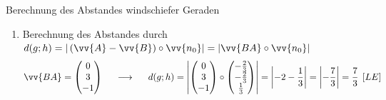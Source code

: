 \begin{bsp}{Berechnung des Abstandes windschiefer Geraden}{}
\begin{enumerate}
\[\begin{pmatrix}
    \end{pmatrix} = \begin{pmatrix}
        -\frac{2}{3}\\-\frac{2}{3}\\ \frac{1}{3}
    \end{pmatrix}\]
    \item Berechnung des Abstandes durch  \(d(g;h) = |\left(\vv{A} - \vv{B}\right)\circ \vv{n_0}| = |\vv{BA}\circ \vv{n_0}|\)
    \[\vv{BA} = \begin{pmatrix}
        0\\3\\-1
    \end{pmatrix} \hspace{0.5cm}\longrightarrow\hspace{0.5cm} d(g;h) = \left|\begin{pmatrix}
        0\\3\\-1
    \end{pmatrix} \circ \begin{pmatrix}
        -\frac{2}{3}\\-\frac{2}{3}\\ \frac{1}{3}
    \end{pmatrix} \right| = \left|-2-\dfrac{1}{3}\right| = \left|-\dfrac{7}{3}\right| = \dfrac{7}{3}\hspace{0.15cm}[LE]\]
    \end{enumerate}
\end{bsp}

